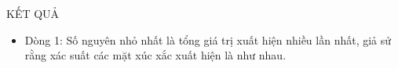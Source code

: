 KẾT QUẢ
\begin{itemize}
	\item     Dòng 1: Số nguyên nhỏ nhất là tổng giá trị xuất hiện nhiều lần nhất, giả sử rằng         xác suất các mặt xúc xắc xuất hiện là như nhau.   
\end{itemize}